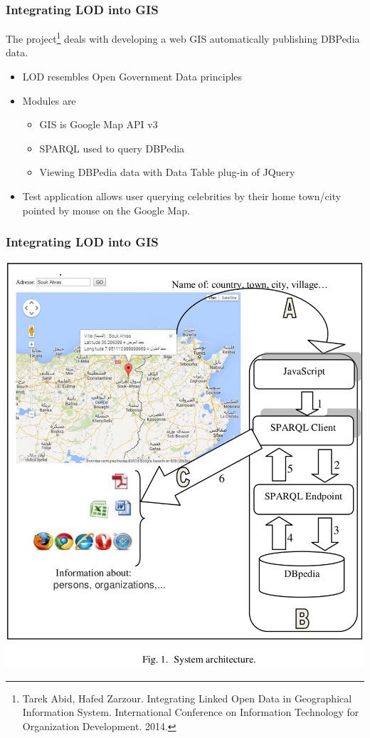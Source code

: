 \documentclass[10pt]{beamer}
\begin{document}

\begin{frame}
  \frametitle{Integrating LOD into GIS}
  The project\footnote{Tarek Abid, Hafed Zarzour. Integrating Linked Open Data in Geographical
Information System. International Conference on Information Technology for Organization Development. 2014. } deals with developing a web GIS automatically publishing DBPedia data.
  \begin{itemize}
  \item LOD resembles Open Government Data principles
  \item Modules are
    \begin{itemize}
    \item GIS is Google Map API v3
    \item SPARQL used to query DBPedia
    \item Viewing DBPedia data with Data Table plug-in of JQuery
    \end{itemize}
  \item Test application allows user querying celebrities by their home town/city pointed by mouse on the Google Map.
  \end{itemize}
\end{frame}

\begin{frame}
  \frametitle{Integrating LOD into GIS}
  \centering
  \includegraphics[width=0.65\linewidth]{integrating-lod-gis-arch.png}
\end{frame}
\end{document}
